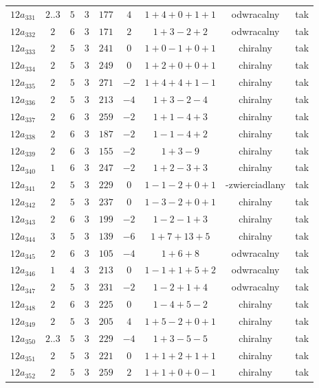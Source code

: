 \begin{longtable}{ccccccccc}
$12a_{331}$ & $2..3$ & $5$ & $3$ & $177$ & $4$ & $1+4+0+1+1$ & odwracalny & tak \\
$12a_{332}$ & $2$ & $6$ & $3$ & $171$ & $2$ & $1+3-2+2$ & odwracalny & tak \\
$12a_{333}$ & $2$ & $5$ & $3$ & $241$ & $0$ & $1+0-1+0+1$ & chiralny & tak \\
$12a_{334}$ & $2$ & $5$ & $3$ & $249$ & $0$ & $1+2+0+0+1$ & chiralny & tak \\
$12a_{335}$ & $2$ & $5$ & $3$ & $271$ & $-2$ & $1+4+4+1-1$ & chiralny & tak \\
$12a_{336}$ & $2$ & $5$ & $3$ & $213$ & $-4$ & $1+3-2-4$ & chiralny & tak \\
$12a_{337}$ & $2$ & $6$ & $3$ & $259$ & $-2$ & $1+1-4+3$ & chiralny & tak \\
$12a_{338}$ & $2$ & $6$ & $3$ & $187$ & $-2$ & $1-1-4+2$ & chiralny & tak \\
$12a_{339}$ & $2$ & $6$ & $3$ & $155$ & $-2$ & $1+3-9$ & chiralny & tak \\
$12a_{340}$ & $1$ & $6$ & $3$ & $247$ & $-2$ & $1+2-3+3$ & chiralny & tak \\
$12a_{341}$ & $2$ & $5$ & $3$ & $229$ & $0$ & $1-1-2+0+1$ & -zwierciadlany & tak \\
$12a_{342}$ & $2$ & $5$ & $3$ & $237$ & $0$ & $1-3-2+0+1$ & chiralny & tak \\
$12a_{343}$ & $2$ & $6$ & $3$ & $199$ & $-2$ & $1-2-1+3$ & chiralny & tak \\
$12a_{344}$ & $3$ & $5$ & $3$ & $139$ & $-6$ & $1+7+13+5$ & chiralny & tak \\
$12a_{345}$ & $2$ & $6$ & $3$ & $105$ & $-4$ & $1+6+8$ & odwracalny & tak \\
$12a_{346}$ & $1$ & $4$ & $3$ & $213$ & $0$ & $1-1+1+5+2$ & odwracalny & tak \\
$12a_{347}$ & $2$ & $5$ & $3$ & $231$ & $-2$ & $1-2+1+4$ & odwracalny & tak \\
$12a_{348}$ & $2$ & $6$ & $3$ & $225$ & $0$ & $1-4+5-2$ & chiralny & tak \\
$12a_{349}$ & $2$ & $5$ & $3$ & $205$ & $4$ & $1+5-2+0+1$ & chiralny & tak \\
$12a_{350}$ & $2..3$ & $5$ & $3$ & $229$ & $-4$ & $1+3-5-5$ & chiralny & tak \\
$12a_{351}$ & $2$ & $5$ & $3$ & $221$ & $0$ & $1+1+2+1+1$ & chiralny & tak \\
$12a_{352}$ & $2$ & $5$ & $3$ & $259$ & $2$ & $1+1+0+0-1$ & chiralny & tak \\

\end{longtable}
